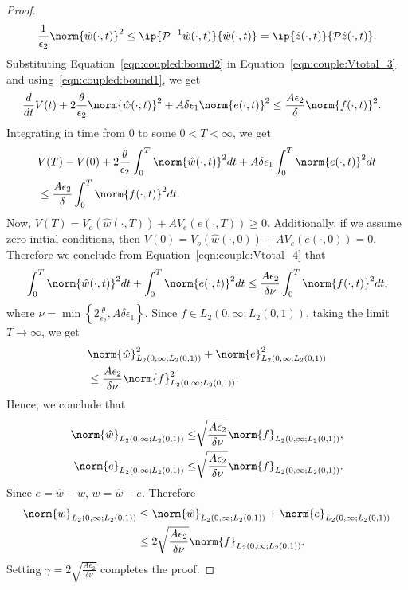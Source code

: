 \documentclass[US letter, 9 pt, conference]{ieeeconf}  \usepackage{setspace}
\newcommand{\wh}{\hat{w}}
\newcommand{\lt}{L_2(0,1)}
\newcommand{\pop}{\mathcal{P}}
\newcommand{\pinv}{\mathcal{P}^{-1}}
\newcommand{\zh}{\hat{z}}
\begin{document}
\begin{proof}
\begin{equation}\label{eqn:coupled:bound2}
\frac{1}{\epsilon_2} \norm{\wh(\cdot,t)}^2 \leq \ip{\pinv \wh(\cdot,t)}{ \wh(\cdot,t)}=\ip{\zh(\cdot,t)}{\pop \zh(\cdot,t)}.
\end{equation} Substituting Equation~\eqref{eqn:coupled:bound2} in Equation~\eqref{eqn:couple:Vtotal_3} and using~\eqref{eqn:coupled:bound1}, we get
\begin{align*}
&\frac{d}{dt}V(t)+2\frac{\theta}{\epsilon_2} \norm{\wh(\cdot,t)}^2+A\delta \epsilon_1 \norm{e(\cdot,t)}^2  \leq \frac{A \epsilon_2 }{\delta}\norm{f(\cdot,t)}^2.
\end{align*} Integrating in time from $0$ to some $0<T<\infty$, we get
\begin{align}
&V(T)-V(0)+2\frac{\theta}{\epsilon_2} \int_0^T \norm{\wh(\cdot,t)}^2dt+A\delta \epsilon_1 \int_0^T \norm{e(\cdot,t)}^2 dt \nonumber  \\
&\label{eqn:couple:Vtotal_4}\leq \frac{A \epsilon_2 }{\delta}\int_0^T \norm{f(\cdot,t)}^2 dt.
\end{align} Now,
$V(T)=V_o(\wh(\cdot,T))+A V_e(e(\cdot,T)) \geq 0$. Additionally, if we assume zero initial conditions, then
$V(0)=V_o(\wh(\cdot,0))+A V_e(e(\cdot,0)) = 0$. Therefore we conclude from Equation~\eqref{eqn:couple:Vtotal_4} that
\[ \int_0^T \norm{\wh(\cdot,t)}^2dt+\int_0^T \norm{e(\cdot,t)}^2 dt \nonumber \leq \frac{A \epsilon_2 }{\delta \nu}\int_0^T \norm{f(\cdot,t)}^2 dt,\] where $\nu=\min \left\lbrace 2\frac{\theta}{\epsilon_2},A\delta \epsilon_1 \right\rbrace$. Since $f \in L_2(0,\infty;\lt)$, taking the limit $T \rightarrow \infty$, we get
\begin{align*}
& \norm{\wh}^2_{L_2(0,\infty;\lt)}+ \norm{e}^2_{L_2(0,\infty;\lt)} \nonumber \\
&\leq \frac{A \epsilon_2 }{\delta \nu}\norm{f}^2_{L_2(0,\infty;\lt)}.
\end{align*} Hence, we conclude that
\begin{align*}
\norm{\wh}_{L_2(0,\infty;\lt)} \leq &\sqrt{\frac{A \epsilon_2 }{\delta \nu}}\norm{f}_{L_2(0,\infty;\lt)},\\
\norm{e}_{L_2(0,\infty;\lt)} \leq &\sqrt{\frac{A \epsilon_2 }{\delta \nu}}\norm{f}_{L_2(0,\infty;\lt)}.
\end{align*} Since $e=\wh-w$, $w=\wh-e$. Therefore
\begin{align*}
\norm{w}_{L_2(0,\infty;\lt)} &\leq \norm{\wh}_{L_2(0,\infty;\lt)}+\norm{e}_{L_2(0,\infty;\lt)}\\
&\leq 2 \sqrt{\frac{A \epsilon_2 }{\delta \nu}}\norm{f}_{L_2(0,\infty;\lt)}.
\end{align*} Setting $\gamma=2\sqrt{\frac{A \epsilon_2 }{\delta \nu}}$ completes the proof.
\end{proof}
\end{document}
